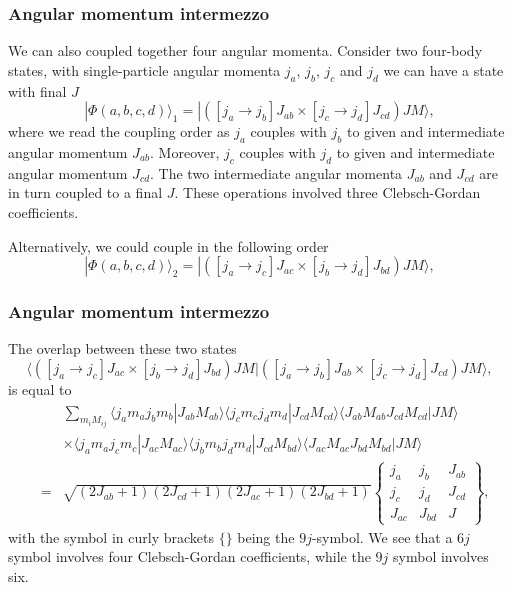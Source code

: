 \documentclass[compress]{beamer}
\begin{document}
\frame
{
\frametitle{Angular momentum intermezzo}
\begin{small}
{\scriptsize
We can also coupled together four angular momenta. Consider two four-body states, with single-particle angular momenta $j_a$, $j_b$, $j_c$ and $j_d$ we can have a state with final $J$
\[
|\Phi(a,b,c,d)\rangle_1 = | ([j_a\rightarrow j_b]J_{ab}\times [j_c\rightarrow j_d]J_{cd}) JM\rangle, 
\]
where we read the coupling order as $j_a$ couples with $j_b$ to given and intermediate angular momentum $J_{ab}$. 
Moreover, $j_c$ couples with $j_d$ to given and intermediate angular momentum $J_{cd}$.  The two intermediate angular momenta $J_{ab}$ and $J_{cd}$
are in turn coupled to a final $J$.  These operations involved three Clebsch-Gordan coefficients. 

Alternatively, we could couple in the following order
\[
|\Phi(a,b,c,d)\rangle_2 = | ([j_a\rightarrow j_c]J_{ac}\times [j_b\rightarrow j_d]J_{bd}) JM\rangle, 
\]
}
\end{small}
}


\frame
{
\frametitle{Angular momentum intermezzo}
\begin{small}
{\scriptsize
The overlap between these two states
\[
\langle([j_a\rightarrow j_c]J_{ac}\times [j_b\rightarrow j_d]J_{bd}) JM| ([j_a\rightarrow j_b]J_{ab}\times [j_c\rightarrow j_d]J_{cd}) JM\rangle, 
\]
is equal to 
\begin{eqnarray}
\nonumber
& & \sum_{m_iM_{ij}}\langle j_am_aj_bm_b|J_{ab}M_{ab}\rangle \langle j_cm_cj_dm_d|J_{cd}M_{cd}\rangle \langle J_{ab}M_{ab}J_{cd}M_{cd}|JM\rangle \\
& & \times\langle j_am_aj_cm_c|J_{ac}M_{ac}\rangle \langle j_bm_bj_dm_d|J_{cd}M_{bd}\rangle \langle J_{ac}M_{ac}J_{bd}M_{bd}|JM\rangle \\  \nonumber
&= & \sqrt{(2J_{ab}+1)(2J_{cd}+1)(2J_{ac}+1)(2J_{bd}+1)}\left\{\begin{array}{ccc} j_a & j_b& J_{ab} \\ j_c & j_d& J_{cd} \\J_{ac} & J_{bd}& J\end{array}\right\}
, \nonumber
\end{eqnarray}
with the symbol in curly brackets $\{\}$ being the $9j$-symbol. We see  that a $6j$ symbol  involves four Clebsch-Gordan coefficients, while the $9j$ symbol
involves six.
}
\end{small}
}
\end{document}

